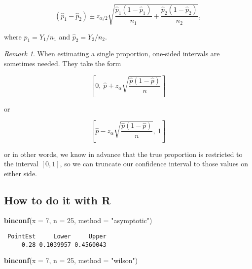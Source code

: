 \documentclass[]{book}
\newenvironment{Shaded}{\begin{snugshade}}{\end{snugshade}}
\newcommand{\KeywordTok}[1]{\textcolor[rgb]{0.13,0.29,0.53}{\textbf{{#1}}}}
\newcommand{\DataTypeTok}[1]{\textcolor[rgb]{0.13,0.29,0.53}{{#1}}}
\newcommand{\DecValTok}[1]{\textcolor[rgb]{0.00,0.00,0.81}{{#1}}}
\newcommand{\StringTok}[1]{\textcolor[rgb]{0.31,0.60,0.02}{{#1}}}
\newcommand{\NormalTok}[1]{{#1}}
\numberwithin{equation}{chapter}
\numberwithin{figure}{chapter}
\theoremstyle{plain}
\theoremstyle{definition}
\theoremstyle{remark}
\theoremstyle{definition}
\theoremstyle{definition}
\theoremstyle{remark}
\newtheorem*{remark}{Remark}
\begin{document}
\begin{equation}
\left(\hat{p}_{1}-\hat{p}_{2}\right)\pm z_{\alpha/2}\sqrt{\frac{\hat{p}_{1}(1-\hat{p}_{1})}{n_{1}}+\frac{\hat{p}_{2}(1-\hat{p}_{2})}{n_{2}}},
\end{equation}

where \(\hat{p}_{1}=Y_{1}/n_{1}\) and \(\hat{p}_{2}=Y_{2}/n_{2}\).

\bigskip

\begin{remark}
When estimating a single proportion, one-sided intervals are sometimes
needed. They take the form

\begin{equation}
\left[0,\ \hat{p}+z_{\alpha}\sqrt{\frac{\hat{p}(1-\hat{p})}{n}}\right]
\end{equation}

or

\begin{equation}
\left[\hat{p}-z_{\alpha}\sqrt{\frac{\hat{p}(1-\hat{p})}{n}},\ 1\right]
\end{equation}

or in other words, we know in advance that the true proportion is
restricted to the interval \([0,1]\), so we can truncate our confidence
interval to those values on either side.
\end{remark}

\subsection{How to do it with R}\label{how-to-do-it-with-r-35}

\begin{Shaded}
\begin{Highlighting}[]
\KeywordTok{binconf}\NormalTok{(}\DataTypeTok{x =} \DecValTok{7}\NormalTok{, }\DataTypeTok{n =} \DecValTok{25}\NormalTok{, }\DataTypeTok{method =} \StringTok{"asymptotic"}\NormalTok{)}
\end{Highlighting}
\end{Shaded}

\begin{verbatim}
 PointEst     Lower     Upper
     0.28 0.1039957 0.4560043
\end{verbatim}

\begin{Shaded}
\begin{Highlighting}[]
\KeywordTok{binconf}\NormalTok{(}\DataTypeTok{x =} \DecValTok{7}\NormalTok{, }\DataTypeTok{n =} \DecValTok{25}\NormalTok{, }\DataTypeTok{method =} \StringTok{"wilson"}\NormalTok{)}
\end{Highlighting}
\end{Shaded}
\end{document}
